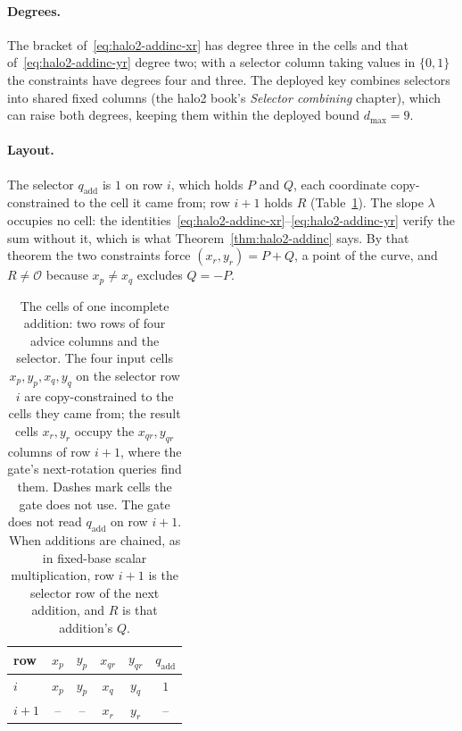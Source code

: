 \documentclass[11pt,a4paper]{article}
\theoremstyle{definition}
\begin{document}
\paragraph{Degrees.}
The bracket of~\eqref{eq:halo2-addinc-xr} has degree three in the cells
and that of~\eqref{eq:halo2-addinc-yr} degree two; with a selector column
taking values in $\{0, 1\}$ the constraints have degrees four and three.
The deployed key combines selectors into shared fixed columns (the halo2
book's \emph{Selector combining} chapter), which can raise both degrees,
keeping them within the deployed bound $d_{\max} = 9$.

\paragraph{Layout.}
The selector $q_{\mathrm{add}}$ is $1$ on row $i$, which holds $P$ and
$Q$, each coordinate copy-constrained to the cell it came from; row
$i + 1$ holds $R$ (Table~\ref{tab:halo2-addinc-region}). The slope
$\lambda$ occupies no cell: the
identities~\eqref{eq:halo2-addinc-xr}--\eqref{eq:halo2-addinc-yr} verify
the sum without it, which is what Theorem~\ref{thm:halo2-addinc} says. By
that theorem the two constraints force $(x_r, y_r) = P + Q$, a point of
the curve, and $R \ne \mathcal O$ because $x_p \ne x_q$ excludes
$Q = -P$.

\begin{table}[htbp]
\centering
\begin{tabular}{l cccc c}
\toprule
row & $x_p$ & $y_p$ & $x_{qr}$ & $y_{qr}$ & $q_{\mathrm{add}}$ \\
\midrule
$i$     & $x_p$ & $y_p$ & $x_q$ & $y_q$ & $1$ \\
$i + 1$ & --    & --    & $x_r$ & $y_r$ & -- \\
\bottomrule
\end{tabular}
\caption{The cells of one incomplete addition: two rows of four advice
columns and the selector. The four input cells $x_p, y_p, x_q, y_q$ on
the selector row $i$ are copy-constrained to the cells they came from;
the result cells $x_r, y_r$ occupy the $x_{qr}, y_{qr}$ columns of row
$i + 1$, where the gate's next-rotation queries find them. Dashes mark
cells the gate does not use. The gate does not read $q_{\mathrm{add}}$ on
row $i + 1$. When additions are chained, as in fixed-base scalar
multiplication, row $i + 1$ is the selector row of the next addition, and
$R$ is that addition's $Q$.}
\label{tab:halo2-addinc-region}
\end{table}
\end{document}
